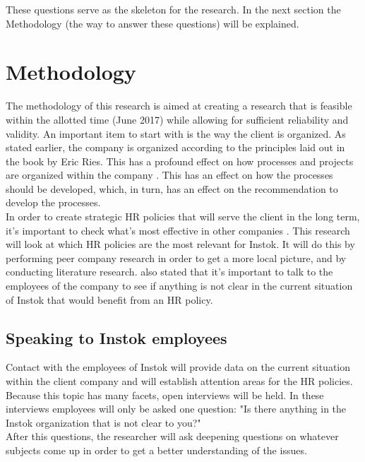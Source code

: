 \documentclass[man]{apa6}
\begin{document}
These questions serve as the skeleton for the research. In the next section the Methodology (the way to answer these questions) will be explained.



\section{Methodology}
The methodology of this research is aimed at creating a research that is feasible within the allotted time (June 2017) while allowing for sufficient reliability and validity. An important item to start with is the way the client is organized. As stated earlier, the company is organized according to the principles laid out in the book by Eric Ries. This has a profound effect on how processes and projects are organized within the company \parencite{RIES2011}. This has an effect on how the processes should be developed, which, in turn, has an effect on the recommendation to develop the processes.\\
In order to create strategic HR policies that will serve the client in the long term, it's important to check what's most effective in other companies \parencite{SNL2013}. This research will look at which HR policies are the most relevant for Instok. It will do this by performing peer company research in order to get a more local picture, and by conducting literature research. \cite{HRCA2016} also stated that it's important to talk to the employees of the company to see if anything is not clear in the current situation of Instok that would benefit from an HR policy.

\subsection{Speaking to Instok employees}
Contact with the employees of Instok will provide data on the current situation within the client company and will establish attention areas for the HR policies. Because this topic has many facets, open interviews will be held. In these interviews employees will only be asked one question: "Is there anything in the Instok organization that is not clear to you?"\\
After this questions, the researcher will ask deepening questions on whatever subjects come up in order to get a better understanding of the issues.
\end{document}
